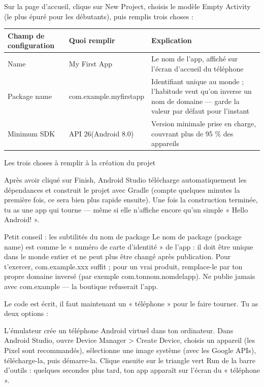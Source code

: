 
Sur la page d'accueil, clique sur New Project, choisis le modèle Empty Activity (le plus épuré pour les débutants), puis remplis trois choses :

\begin{center}
\begin{tabularx}{\linewidth}{|X|X|X|}
\hline
\textbf{Champ de configuration} & \textbf{Quoi remplir} & \textbf{Explication} \tabularnewline
\hline
Name & My First App & Le nom de l'app, affiché sur l'écran d'accueil du téléphone \tabularnewline
Package name & com.example.myfirstapp & Identifiant unique au monde ; l'habitude veut qu'on inverse un nom de domaine — garde la valeur par défaut pour l'instant \tabularnewline
Minimum SDK & API 26(Android 8.0) & Version minimale prise en charge, couvrant plus de 95 \% des appareils \tabularnewline
\hline
\end{tabularx}
\end{center}

\begin{center}\small\color{gray}Les trois choses à remplir à la création du projet\end{center}

Après avoir cliqué sur Finish, Android Studio télécharge automatiquement les dépendances et construit le projet avec Gradle (compte quelques minutes la première fois, ce sera bien plus rapide ensuite). Une fois la construction terminée, tu as une app qui tourne — même si elle n'affiche encore qu'un simple « Hello Android! ».

\begin{tcbinfo}{Petit conseil : les subtilités du nom de package}
Le nom de package (package name) est comme le « numéro de carte d'identité » de l'app : il doit être unique dans le monde entier et ne peut plus être changé après publication. Pour t'exercer, com.example.xxx suffit ; pour un vrai produit, remplace-le par ton propre domaine inversé (par exemple com.tonnom.nomdelapp). Ne publie jamais avec com.example — la boutique refuserait l'app.

\end{tcbinfo}


Le code est écrit, il faut maintenant un « téléphone » pour le faire tourner. Tu as deux options :


L'émulateur crée un téléphone Android virtuel dans ton ordinateur. Dans Android Studio, ouvre Device Manager > Create Device, choisis un appareil (les Pixel sont recommandés), sélectionne une image système (avec les Google APIs), télécharge-la, puis démarre-la. Clique ensuite sur le triangle vert Run de la barre d'outils : quelques secondes plus tard, ton app apparaît sur l'écran du « téléphone ».

